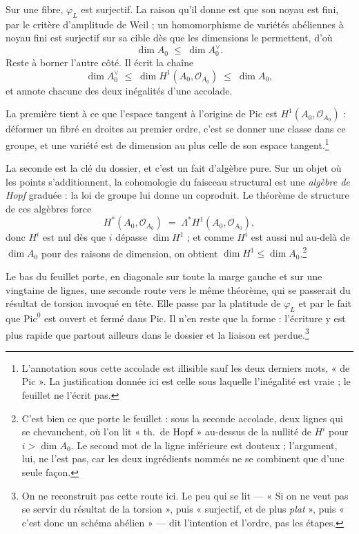 \documentclass[11pt,a4paper]{article}
\begin{document}
Sur une fibre, $\varphi_{L}$ est surjectif. La raison qu'il donne est que son
noyau est fini, par le critère d'amplitude de Weil ; un homomorphisme de
variétés abéliennes à noyau fini est surjectif sur sa cible dès que les
dimensions le permettent, d'où
\[
  \dim A_{0} \;\leqslant\; \dim A^{\vee}_{0}.
\]
Reste à borner l'autre côté. Il écrit la chaîne
\[
  \dim A^{\vee}_{0} \;\leqslant\; \dim H^{1}(A_{0}, \mathcal{O}_{A_{0}})
  \;\leqslant\; \dim A_{0},
\]
et annote chacune des deux inégalités d'une accolade.

La première tient à ce que l'espace tangent à l'origine de
$\mathrm{Pic}$ est $H^{1}(A_{0}, \mathcal{O}_{A_{0}})$ : déformer un fibré en
droites au premier ordre, c'est se donner une classe dans ce groupe, et une
variété est de dimension au plus celle de son espace
tangent.\footnote{L'annotation sous cette accolade est illisible sauf les deux
derniers mots, « de Pic ». La justification donnée ici est celle sous laquelle
l'inégalité est vraie ; le feuillet ne l'écrit pas.}

La seconde est la clé du dossier, et c'est un fait d'algèbre pure. Sur un
objet où les points s'additionnent, la cohomologie du faisceau structural est
une \emph{algèbre de Hopf} graduée : la loi de groupe lui donne un coproduit.
Le théorème de structure de ces algèbres force
\[
  H^{*}(A_{0}, \mathcal{O}_{A_{0}}) \;=\;
  \Lambda^{*} H^{1}(A_{0}, \mathcal{O}_{A_{0}}),
\]
donc $H^{i}$ est nul dès que $i$ dépasse $\dim H^{1}$ ; et comme $H^{i}$ est
aussi nul au-delà de $\dim A_{0}$ pour des raisons de dimension, on obtient
$\dim H^{1} \leqslant \dim A_{0}$.\footnote{C'est bien ce que porte le
feuillet : sous la seconde accolade, deux lignes qui se chevauchent, où l'on
lit « th.\ de Hopf » au-dessus de la nullité de $H^{i}$ pour $i > \dim A_{0}$.
Le second mot de la ligne inférieure est douteux ; l'argument, lui, ne l'est
pas, car les deux ingrédients nommés ne se combinent que d'une seule façon.}

Le bas du feuillet porte, en diagonale sur toute la marge gauche et sur une
vingtaine de lignes, une seconde route vers le même théorème, qui se passerait
du résultat de torsion invoqué en tête. Elle passe par la platitude de
$\varphi_{L}$ et par le fait que $\mathrm{Pic}^{0}$ est ouvert et fermé dans
$\mathrm{Pic}$. Il n'en reste que la forme : l'écriture y est plus rapide que
partout ailleurs dans le dossier et la liaison est perdue.\footnote{On ne
reconstruit pas cette route ici. Le peu qui se lit — « Si on ne veut pas se
servir du résultat de la torsion », puis « surjectif, et de plus \emph{plat} »,
puis « c'est donc un schéma abélien » — dit l'intention et l'ordre, pas les
étapes.}
\end{document}
